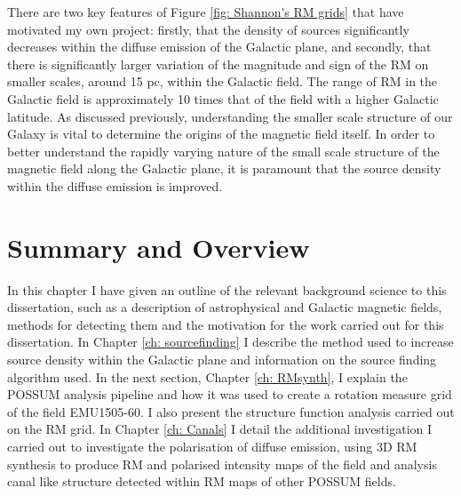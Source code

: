 There are two key features of Figure \ref{fig: Shannon's RM grids} that have motivated my own project: firstly, that the density of sources significantly decreases within the diffuse emission of the Galactic plane, and secondly, that there is significantly larger variation of the magnitude and sign of the RM on smaller scales, around 15 pc, within the Galactic field. The range of RM in the Galactic field is approximately 10 times that of the field with a higher Galactic latitude. As discussed previously, understanding the smaller scale structure of our Galaxy is vital to determine the origins of the magnetic field itself. In order to better understand the rapidly varying nature of the small scale structure of the magnetic field along the Galactic plane, it is paramount that the source density within the diffuse emission is improved.



\section{Summary and Overview}

In this chapter I have given an outline of the relevant background science to this dissertation, such as a description of astrophysical and Galactic magnetic fields, methods for detecting them and the motivation for the work carried out for this dissertation. In Chapter \ref{ch: sourcefinding} I describe the method used to increase source density within the Galactic plane and information on the source finding algorithm used. In the next section, Chapter \ref{ch: RMsynth}, I explain the POSSUM analysis pipeline and how it was used to create a rotation measure grid of the field EMU1505-60. I also present the structure function analysis carried out on the RM grid. In Chapter \ref{ch: Canals} I detail the additional investigation I carried out to investigate the polarisation of diffuse emission, using 3D RM synthesis to produce RM and polarised intensity maps of the field and analysis canal like structure detected within RM maps of other POSSUM fields.

